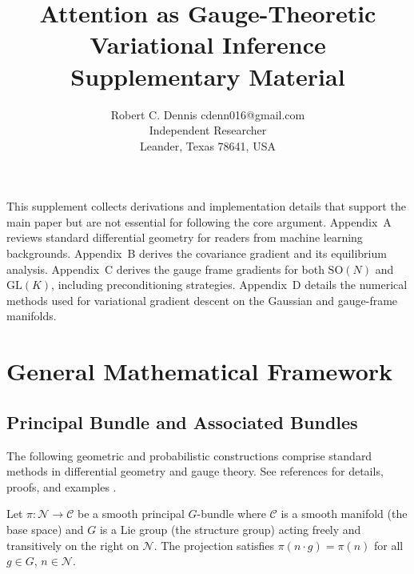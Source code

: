 \documentclass[twoside,11pt]{article}
\begin{document}

\title{Attention as Gauge-Theoretic Variational Inference\\[6pt]
\large Supplementary Material}

\author{\name Robert C. Dennis \email cdenn016@gmail.com \\
       \addr Independent Researcher\\
       \addr Leander, Texas 78641, USA}


\maketitle


This supplement collects derivations and implementation details that support the main paper but are not essential for following the core argument.  Appendix~A reviews standard differential geometry for readers from machine learning backgrounds. Appendix~B derives the covariance gradient and its equilibrium analysis.  Appendix~C derives the gauge frame gradients for both $\mathrm{SO}(N)$ and $\mathrm{GL}(K)$, including preconditioning strategies.  Appendix~D details the numerical methods used for variational gradient descent on the Gaussian and gauge-frame manifolds.

\appendix

\section{General Mathematical Framework}
\subsection{Principal Bundle and Associated Bundles}

The following geometric and probabilistic constructions comprise standard methods in differential geometry and gauge theory.  See references for details, proofs, and examples \citep{nakahara2003geometry,frankel2011geometry,blei2017variational,amari2016information}.

Let $\pi: \mathcal{N} \to \mathcal{C}$ be a smooth principal $G$-bundle where $\mathcal{C}$ is a smooth manifold (the base space) and $G$ is a Lie group (the structure group) acting freely and transitively on the right on $\mathcal{N}$. The projection satisfies $\pi(n \cdot g) = \pi(n)$ for all $g \in G$, $n \in \mathcal{N}$.
\end{document}
